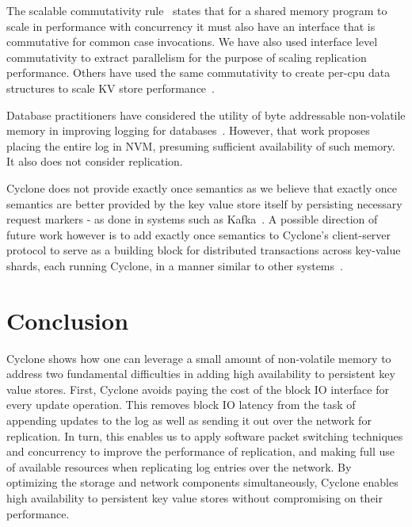 \documentclass[pageno]{jpaper}
\begin{document}
The scalable commutativity rule~\cite{scalable_commutativity} states that for a
shared memory program to scale in performance with concurrency it must also have
an interface that is commutative for common case invocations. We have also used
interface level commutativity to extract parallelism for the purpose of scaling
replication performance. Others have used the same commutativity to create
per-cpu data structures to scale KV store performance~\cite{flodb}.

Database practitioners have considered the utility of byte addressable
non-volatile memory in improving logging for
databases~\cite{nvram_log}. However, that work proposes placing the entire log
in NVM, presuming sufficient availability of such memory. It also does not
consider replication.

Cyclone does not provide exactly once semantics as we
believe that exactly once semantics are better provided by the key value store
itself by persisting necessary request markers - as done in systems such as
Kafka~\cite{kafka}. A possible direction of future work however is to add
exactly once semantics to Cyclone's client-server protocol to serve as a
building block for distributed transactions across key-value shards, each
running Cyclone, in a manner similar to other systems~\cite{raft_lin}.

\section{Conclusion}
Cyclone shows how one can leverage a small amount of non-volatile memory to
address two fundamental difficulties in adding high availability to persistent
key value stores. First, Cyclone avoids
paying the cost of the block IO interface for every update operation. This
removes block IO latency from the task of appending updates to the log as well
as sending it out over the network for replication. In turn, this enables us to
apply software packet switching techniques and concurrency to improve the
performance of replication, and making full use of available resources when
replicating log entries over the network. By optimizing the storage and network
components simultaneously, Cyclone enables high availability to persistent key
value stores without compromising on their performance.
\newcommand\myurl[2]{\url{#1}}


\end{document}
